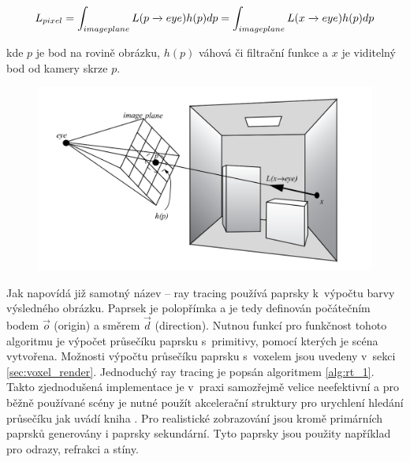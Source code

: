 \begin{equation} \label{eq:rt_1}
	L_{pixel} = \int_{imageplane}L(p \xrightarrow{} eye)h(p)dp \\= \int_{imageplane}L(x \xrightarrow{} eye)h(p)dp
\end{equation}

kde $p$ je bod na rovině obrázku, $h(p)$ váhová či filtrační funkce a $x$ je viditelný bod od kamery skrze $p$.

\begin{figure}[H]
	\centering
	\captionsetup{justification=centering}
	\includegraphics[scale=1]{obrazky-figures/ray_tracing_plane.png}
	\label{fig:scene_ray}
\end{figure}


Jak napovídá již samotný název -- ray tracing používá paprsky k~výpočtu barvy výsledného obrázku. Paprsek je polopřímka a je tedy definován počátečním bodem $\Vec{o}$ (origin) a směrem $\Vec{d}$ (direction). Nutnou funkcí pro funkčnost tohoto algoritmu je výpočet průsečíku paprsku s~primitivy, pomocí kterých je scéna vytvořena. Možnosti výpočtu průsečíku paprsku s~voxelem jsou uvedeny v~sekci \ref{sec:voxel_render}. Jednoduchý ray tracing je popsán algoritmem \ref{alg:rt_1}. Takto zjednodušená implementace je v~praxi samozřejmě velice neefektivní a pro běžně používané scény je nutné použít akcelerační struktury pro urychlení hledání průsečíku jak uvádí kniha \cite{accelerated_rt}. Pro realistické zobrazování jsou kromě primárních paprsků generovány i paprsky sekundární. Tyto paprsky jsou použity například pro odrazy, refrakci a stíny.

